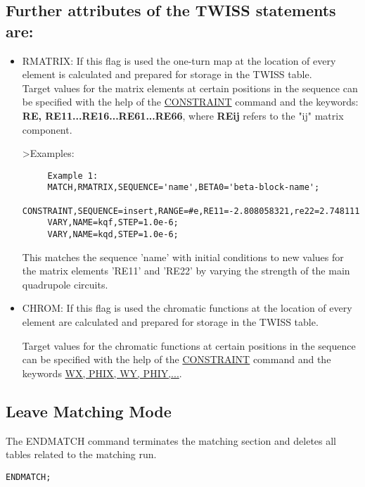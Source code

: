 \subsection{Further attributes of the TWISS statements are:}

\begin{itemize}
	\item 
 RMATRIX: If this flag is used the one-turn map at the location of every
 element is calculated and prepared for storage in the TWISS table.
\\Target values for the matrix elements at certain positions in the sequence
 can be specified with the help of the \href{match_con.html#constraint}{CONSTRAINT}
 command and the
 keywords: \textbf{RE, RE11...RE16...RE61...RE66}, where \textbf{REij} refers
 to the "ij" matrix component.
  
\textgreater Examples:
 
\begin{verbatim}
     Example 1:
     MATCH,RMATRIX,SEQUENCE='name',BETA0='beta-block-name';
     CONSTRAINT,SEQUENCE=insert,RANGE=#e,RE11=-2.808058321,re22=2.748111197;
     VARY,NAME=kqf,STEP=1.0e-6;
     VARY,NAME=kqd,STEP=1.0e-6;
\end{verbatim}

 This matches the sequence 'name' with initial conditions to new values
 for the matrix elements 'RE11' and 'RE22' by varying the strength of the
 main quadrupole circuits.
\end{itemize}

\begin{itemize}
	\item 
 CHROM: If this flag is used the chromatic functions at the location of every element are calculated and prepared for storage in the TWISS table.

 Target values for the chromatic functions at certain positions in the sequence can be specified with the help of the \href{match_con.html#constraint}{CONSTRAINT} command and the keywords \href{../Introduction/tables.html#normal}{WX, PHIX, WY, PHIY,...}.
\end{itemize}

\subsection{Leave Matching Mode}
 
The ENDMATCH command terminates the matching section and deletes all tables related to the matching run.
 
\begin{verbatim}
ENDMATCH;
\end{verbatim}


